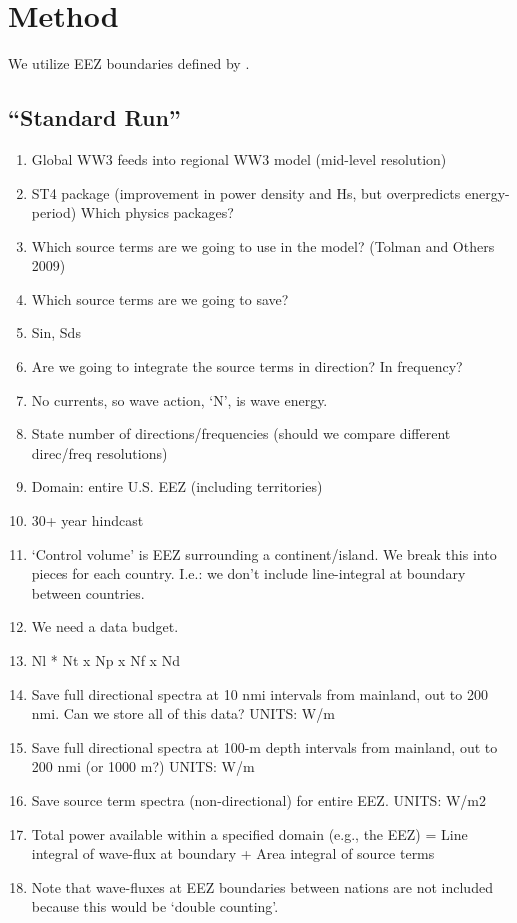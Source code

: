 \documentclass[authoryear,preprint]{elsarticle}
\begin{document}
\section{Method}

We utilize EEZ boundaries defined by \citep[]{flandersmarineinstituteMaritimeBoundariesGeodatabase}.

\subsection{``Standard Run''}
\begin{enumerate}
\item Global WW3 feeds into regional WW3 model (mid-level resolution)
\item ST4 package (improvement in power density and Hs, but overpredicts energy-period) Which physics packages?
\item Which source terms are we going to use in the model? (Tolman and Others 2009)
\item Which source terms are we going to save?
\item Sin, Sds
\item Are we going to integrate the source terms in direction? In frequency?
\item No currents, so wave action, ‘N’, is wave energy.
\item State number of directions/frequencies (should we compare different direc/freq resolutions)
\item Domain: entire U.S. EEZ (including territories)
\item 30+ year hindcast
\item ‘Control volume’ is EEZ surrounding a continent/island. We break this into pieces for each country. I.e.: we don’t include line-integral at boundary between countries.
\item We need a data budget.
\item Nl * Nt x Np x Nf x Nd
\item Save full directional spectra at 10 nmi intervals from mainland, out to 200 nmi. Can we store all of this data? UNITS: W/m
\item Save full directional spectra at 100-m depth intervals from mainland, out to 200 nmi (or 1000 m?) UNITS: W/m
\item Save source term spectra (non-directional) for entire EEZ. UNITS: W/m2
\item Total power available within a specified domain (e.g., the EEZ) = Line integral of wave-flux at boundary + Area integral of source terms
\item Note that wave-fluxes at EEZ boundaries between nations are not included because this would be ‘double counting’.
\end{enumerate}
\end{document}
